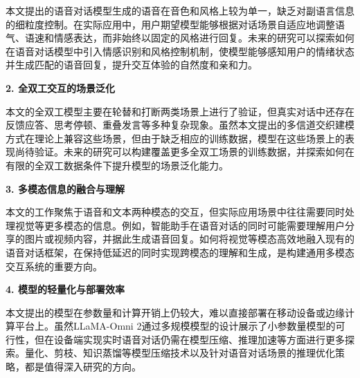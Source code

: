 本文提出的语音对话模型生成的语音在音色和风格上较为单一，缺乏对副语言信息的细粒度控制。在实际应用中，用户期望模型能够根据对话场景自适应地调整语气、语速和情感表达，而非始终以固定的风格进行回复。未来的研究可以探索如何在语音对话模型中引入情感识别和风格控制机制，使模型能够感知用户的情绪状态并生成匹配的语音回复，提升交互体验的自然度和亲和力。

\textbf{2. 全双工交互的场景泛化}

本文的全双工模型主要在轮替和打断两类场景上进行了验证，但真实对话中还存在反馈应答、思考停顿、重叠发言等多种复杂现象。虽然本文提出的多信道交织建模方式在理论上兼容这些场景，但由于缺乏相应的训练数据，模型在这些场景上的表现尚待验证。未来的研究可以构建覆盖更多全双工场景的训练数据，并探索如何在有限的全双工数据条件下提升模型的场景泛化能力。

\textbf{3. 多模态信息的融合与理解}

本文的工作聚焦于语音和文本两种模态的交互，但实际应用场景中往往需要同时处理视觉等更多模态的信息。例如，智能助手在语音对话的同时可能需要理解用户分享的图片或视频内容，并据此生成语音回复。如何将视觉等模态高效地融入现有的语音对话框架，在保持低延迟的同时实现跨模态的理解和生成，是构建通用多模态交互系统的重要方向。

\textbf{4. 模型的轻量化与部署效率}

本文提出的模型在参数量和计算开销上仍较大，难以直接部署在移动设备或边缘计算平台上。虽然LLaMA-Omni 2通过多规模模型的设计展示了小参数量模型的可行性，但在设备端实现实时语音对话仍需在模型压缩、推理加速等方面进行更多探索。量化、剪枝、知识蒸馏等模型压缩技术以及针对语音对话场景的推理优化策略，都是值得深入研究的方向。
